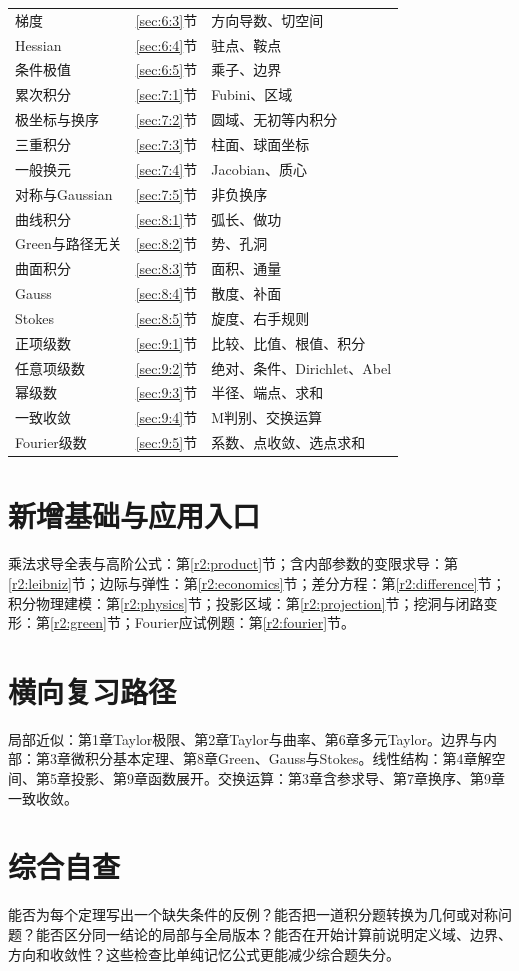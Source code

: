 \begin{longtable}{p{37mm}p{18mm}p{66mm}}
梯度&\ref{sec:6:3}节&方向导数、切空间\\
Hessian&\ref{sec:6:4}节&驻点、鞍点\\
条件极值&\ref{sec:6:5}节&乘子、边界\\
累次积分&\ref{sec:7:1}节&Fubini、区域\\
极坐标与换序&\ref{sec:7:2}节&圆域、无初等内积分\\
三重积分&\ref{sec:7:3}节&柱面、球面坐标\\
一般换元&\ref{sec:7:4}节&Jacobian、质心\\
对称与Gaussian&\ref{sec:7:5}节&非负换序\\
曲线积分&\ref{sec:8:1}节&弧长、做功\\
Green与路径无关&\ref{sec:8:2}节&势、孔洞\\
曲面积分&\ref{sec:8:3}节&面积、通量\\
Gauss&\ref{sec:8:4}节&散度、补面\\
Stokes&\ref{sec:8:5}节&旋度、右手规则\\
正项级数&\ref{sec:9:1}节&比较、比值、根值、积分\\
任意项级数&\ref{sec:9:2}节&绝对、条件、Dirichlet、Abel\\
幂级数&\ref{sec:9:3}节&半径、端点、求和\\
一致收敛&\ref{sec:9:4}节&M判别、交换运算\\
Fourier级数&\ref{sec:9:5}节&系数、点收敛、选点求和\\
\bottomrule\end{longtable}
\section*{新增基础与应用入口}
乘法求导全表与高阶公式：第\ref{r2:product}节；含内部参数的变限求导：第\ref{r2:leibniz}节；边际与弹性：第\ref{r2:economics}节；差分方程：第\ref{r2:difference}节；积分物理建模：第\ref{r2:physics}节；投影区域：第\ref{r2:projection}节；挖洞与闭路变形：第\ref{r2:green}节；Fourier应试例题：第\ref{r2:fourier}节。
\section*{横向复习路径}
局部近似：第1章Taylor极限、第2章Taylor与曲率、第6章多元Taylor。边界与内部：第3章微积分基本定理、第8章Green、Gauss与Stokes。线性结构：第4章解空间、第5章投影、第9章函数展开。交换运算：第3章含参求导、第7章换序、第9章一致收敛。
\section*{综合自查}
能否为每个定理写出一个缺失条件的反例？能否把一道积分题转换为几何或对称问题？能否区分同一结论的局部与全局版本？能否在开始计算前说明定义域、边界、方向和收敛性？这些检查比单纯记忆公式更能减少综合题失分。
